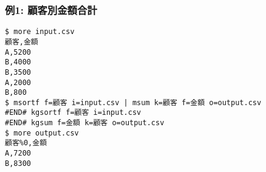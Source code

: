 \subsubsection*{例1: 顧客別金額合計}



\begin{Verbatim}[baselinestretch=0.7,frame=single]
$ more input.csv
顧客,金額
A,5200 
B,4000   
B,3500 
A,2000 
B,800 
$ msortf f=顧客 i=input.csv | msum k=顧客 f=金額 o=output.csv
#END# kgsortf f=顧客 i=input.csv
#END# kgsum f=金額 k=顧客 o=output.csv
$ more output.csv
顧客%0,金額
A,7200
B,8300
\end{Verbatim}

